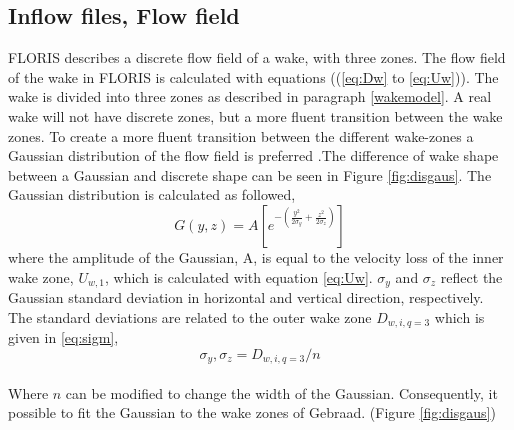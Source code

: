 \subsection{Inflow files, Flow field} FLORIS describes a discrete flow field of a wake, with three zones. The flow field of the wake in FLORIS is calculated with equations ((\ref{eq:Dw} to \ref{eq:Uw})). The wake is divided into three zones as described in paragraph \ref{wakemodel}. A real wake will not have discrete zones, but a more fluent transition between the wake zones. To create a more fluent transition between the different wake-zones a Gaussian distribution of the flow field is preferred \cite{Bastankhah2016}.The difference of wake shape between a Gaussian and discrete shape can be seen in Figure \ref{fig:disgaus}.  The Gaussian distribution is calculated as followed, 
\begin{equation}
\label{eq:gaus}
G(y, z) = A [e^{-(\frac{y^2}{2\sigma_y} + \frac{z^2}{2\sigma_z})}]
\end{equation}
where the amplitude of the Gaussian, A, is equal to the velocity loss of the inner wake zone, $U_{w,1}$, which is calculated with equation \ref{eq:Uw}. $\sigma_y$ and $\sigma_z$ reflect the Gaussian standard deviation in horizontal and vertical direction, respectively. The standard deviations are related to the outer wake zone $D_{w,i,q=3}$ which is given in \ref{eq:sigm},
\begin{equation}
\label{eq:sigm}
\sigma_y,\sigma_z = D_{w,i,q=3}/n 
\end{equation}
\\
Where $n$ can be modified to change the width of the Gaussian. Consequently, it possible to fit the Gaussian to the wake zones of Gebraad. (Figure \ref{fig:disgaus})
